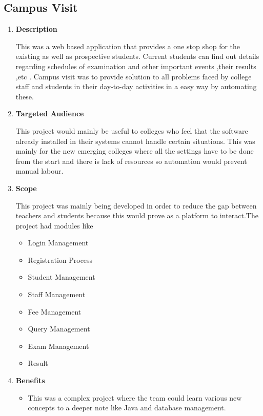 \documentclass[fleqn,10pt]{../SelfArx} %
\begin{document}
\subsection{Campus Visit}
\vspace{0.5cm}
\begin{enumerate}
\item \textbf{Description}

This was a web based application that provides a one stop shop for the existing as well as prospective students. Current students can find out details regarding schedules of examination and other important events ,their results ,etc . Campus visit was to provide solution to all problems faced by college staff and students in their day-to-day activities in a easy way by automating these. 

\item \textbf{Targeted Audience}

This project would mainly be useful to colleges who feel that the software already installed in their systems cannot handle certain situations. This was mainly for the new emerging colleges where all the settings have to be done from the start and there is lack of resources so automation would prevent manual labour.

\item \textbf{Scope}

This project was mainly being developed in order to reduce the gap between teachers and  students because this would prove as a platform to interact.The project had modules like
\begin{itemize}
    \item Login Management 
\item Registration Process 
\item Student Management 
\item Staff Management 
\item Fee Management 
\item Query Management 
\item Exam Management 
\item Result
\end{itemize}


\item \textbf{Benefits}
\begin{itemize}


\item This was a complex project where the team could learn various new concepts to a deeper note like Java and database management.


\end{itemize}
\end{enumerate}
\end{document}
